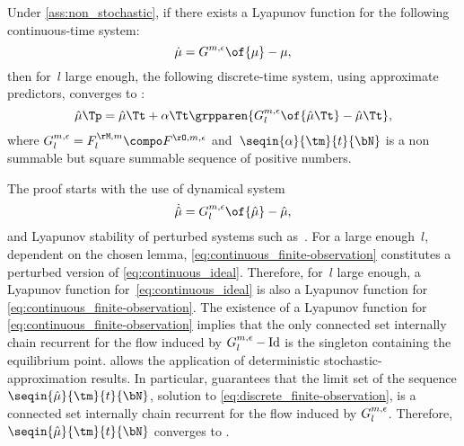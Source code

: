 \begin{proposition}
Under \cref{ass:non_stochastic}, if there exists a Lyapunov function for the following continuous-time system:
\begin{equation}
\label{eq:continuous_ideal}
\dot\mu = \GGe \of{\mu} - \mu,
\end{equation}
then for~\(l\) large enough, the following discrete-time system, using approximate predictors, converges to :
\begin{equation}
\label{eq:discrete_finite-observation}
\muhat\Tp = \muhat\Tt + \alpha\Tt \grpparen{\GGe\Ll \of{\muhat\Tt} - \muhat\Tt},
\end{equation}
where \(\GGe\Ll = \FM\Ll \compo \FOe\) and~\(\seqin{\alpha}{\tm}{t}{\bN}\) is a non summable but square summable sequence of positive numbers.
\end{proposition}

The proof starts with the use of dynamical system
\begin{equation}
\label{eq:continuous_finite-observation}
\dot\muhat = \GGe\Ll \of{\muhat} - \muhat,
\end{equation}
and Lyapunov stability of perturbed systems such as~\cite[ or ]{khalil:2002}.
For a large enough~\(l\), dependent on the chosen lemma, \cref{eq:continuous_finite-observation} constitutes a perturbed version of \cref{eq:continuous_ideal}.
Therefore, for~\(l\) large enough, a Lyapunov function for~\cref{eq:continuous_ideal} is also a Lyapunov function for \cref{eq:continuous_finite-observation}.
The existence of a Lyapunov function for \cref{eq:continuous_finite-observation} implies that the only connected set internally chain recurrent for the flow induced by \(G^{m, \epsilon}_{l} -\mathrm{Id}\) is the singleton containing the equilibrium point.
 allows the application of deterministic stochastic-approximation results.
In particular, \cite[]{benaim:1996} guarantees that the limit set of the sequence \(\seqin{\muhat}{\tm}{t}{\bN}\), solution to \cref{eq:discrete_finite-observation}, is a connected set internally chain recurrent for the flow induced by \(G^{m, \epsilon}_{l}\).
Therefore, \(\seqin{\muhat}{\tm}{t}{\bN}\) converges to .
